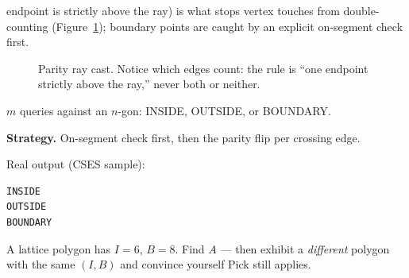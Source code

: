 endpoint is strictly above the ray) is what stops vertex touches
from double-counting (Figure~\ref{fig:raycast}); boundary points
are caught by an explicit on-segment check first.
\begin{figure}[ht]\centering

\caption{Parity ray cast. Notice which edges count: the rule is
``one endpoint strictly above the ray,'' never both or neither.}
\label{fig:raycast}
\end{figure}

\begin{example}\label{ex:pip}
$m$ queries against an $n$-gon: INSIDE, OUTSIDE, or BOUNDARY.
\par\smallskip
\textbf{Strategy.} On-segment check first, then the parity flip
per crossing edge.
\par\smallskip
\begin{solution}

Real output (CSES sample):
\begin{lstlisting}[numbers=none]
INSIDE
OUTSIDE
BOUNDARY
\end{lstlisting}
\end{solution}
\end{example}
\begin{exercise}[medium]\label{exr:pickinv}
A lattice polygon has $I=6$, $B=8$. Find $A$ --- then exhibit a
\emph{different} polygon with the same $(I,B)$ and convince
yourself Pick still applies.
\end{exercise}


